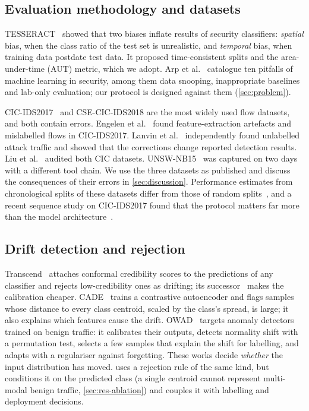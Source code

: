 \subsection{Evaluation methodology and datasets}
TESSERACT~\cite{pendlebury2019tesseract} showed that two biases inflate results of security classifiers:
\emph{spatial} bias, when the class ratio of the test set is unrealistic, and \emph{temporal} bias, when training
data postdate test data. It proposed time-consistent splits and the area-under-time (AUT) metric, which we adopt.
Arp et al.~\cite{arp2022dos} catalogue ten pitfalls of machine learning in security, among them data snooping,
inappropriate baselines and lab-only evaluation; our protocol is designed against them (\cref{sec:problem}).

CIC-IDS2017~\cite{sharafaldin2018} and CSE-CIC-IDS2018 are the most widely used flow datasets, and both contain
errors. Engelen et al.~\cite{engelen2021troubleshooting} found feature-extraction artefacts and mislabelled flows
in CIC-IDS2017. Lanvin et al.~\cite{lanvin2022errors} independently found unlabelled attack traffic and showed
that the corrections change reported detection results. Liu et al.~\cite{liu2022error} audited both CIC
datasets. UNSW-NB15~\cite{moustafa2015unsw} was captured on two days with a different tool chain. We use the
three datasets as published and discuss the consequences of their errors in \cref{sec:discussion}. Performance
estimates from chronological splits of these datasets differ from those of random
splits~\cite{nismara2026temporal}, and a recent sequence study on CIC-IDS2017 found that the protocol matters far
more than the model architecture~\cite{moczkodan2026transformers}.

\subsection{Drift detection and rejection}
Transcend~\cite{jordaney2017transcend} attaches conformal credibility scores to the predictions of any classifier
and rejects low-credibility ones as drifting; its successor~\cite{barbero2022transcending} makes the calibration
cheaper. CADE~\cite{yang2021cade} trains a contrastive autoencoder and flags samples whose distance to every class
centroid, scaled by the class's spread, is large; it also explains which features cause the drift. OWAD~\cite{han2023owad}
targets anomaly detectors trained on benign traffic: it calibrates their outputs, detects normality shift with a
permutation test, selects a few samples that explain the shift for labelling, and adapts with a regulariser
against forgetting. These works decide \emph{whether} the input distribution has moved. \nova{} uses a
rejection rule of the same kind, but conditions it on the predicted class (a single centroid cannot represent
multi-modal benign traffic, \cref{sec:res-ablation}) and couples it with labelling and deployment decisions.

